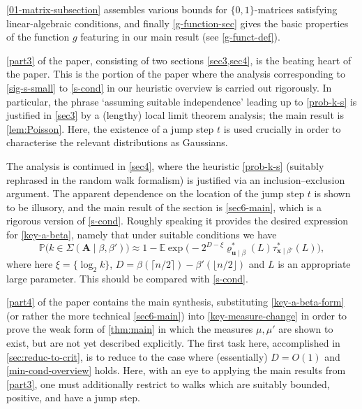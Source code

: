 \documentclass[11pt,reqno]{amsart}
\numberwithin{equation}{section}
\theoremstyle{definition}
\theoremstyle{remark}
\newcommand{\mb}{\mathbb}
\newcommand{\mbf}{\mathbf}
\begin{document}
\cref{01-matrix-subsection} assembles various bounds for $\{0,1\}$-matrices satisfying linear-algebraic conditions, and finally \cref{g-function-sec} gives the basic properties of the function $g$ featuring in our main result (see \cref{g-funct-def}).\vspace*{10pt}

\cref{part3} of the paper, consisting of two sections \cref{sec3,sec4}, is the beating heart of the paper. This is the portion of the paper where the analysis corresponding to \cref{sig-s-small} to \cref{s-cond} in our heuristic overview is carried out rigorously. In particular, the phrase `assuming suitable independence' leading up to \cref{prob-k-s} is justified in \cref{sec3} by a (lengthy) local limit theorem analysis; the main result is \cref{lem:Poisson}. Here, the existence of a jump step $t$ is used crucially in order to characterise the relevant distributions as Gaussians. 

The analysis is continued in \cref{sec4}, where the heuristic \cref{prob-k-s} (suitably rephrased in the random walk formalism) is justified via an inclusion--exclusion argument. The apparent dependence on the location of the jump step $t$ is shown to be illusory, and the main result of the section is \cref{sec6-main}, which is a rigorous version of \cref{s-cond}. Roughly speaking it provides the desired expression for \cref{key-a-beta}, namely that under suitable conditions we have 
\begin{equation}\label{key-a-beta-form} \mb{P}\big(k \in \Sigma(\mbf{A} \mid \beta,\beta')\big) \approx 1 - \mb{E} \exp\big( -2^{D - \xi}  \varrho^*_{\mbf{u} \mid \beta}(L)\tau^*_{\mbf{x} \mid \beta'}(L)\big),\end{equation} where here $\xi = \{ \log_2 k\}$,  $D = \beta(\lceil n/2\rceil) - \beta'(\lfloor n/2\rfloor)$ and $L$ is an appropriate large parameter. This should be compared with \cref{s-cond}.\vspace*{10pt}

\cref{part4} of the paper contains the main synthesis, substituting \cref{key-a-beta-form} (or rather the more technical \cref{sec6-main}) into \cref{key-measure-change} in order to prove the weak form of \cref{thm:main} in which the measures $\mu, \mu'$ are shown to exist, but are not yet described explicitly. The first task here, accomplished in \cref{sec:reduc-to-crit}, is to reduce to the case where (essentially) $D = O(1)$ and \cref{min-cond-overview} holds. Here, with an eye to applying the main results from \cref{part3}, one must additionally restrict to walks which are suitably bounded, positive, and have a jump step.
\end{document}
